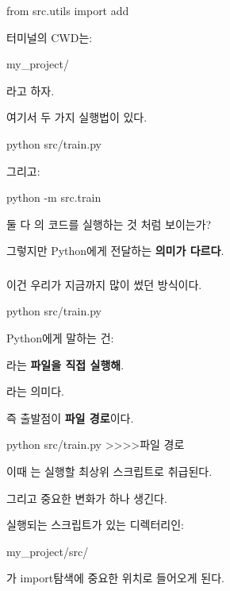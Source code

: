 \begin{dhkcode}
from src.utils import add
\end{dhkcode}

터미널의 CWD는:

\begin{dhkzsh}
my_project/
\end{dhkzsh}

라고 하자.

여기서 두 가지 실행법이 있다.

\begin{dhkzsh}
python src/train.py
\end{dhkzsh}

그리고:

\begin{dhkzsh}
python -m src.train
\end{dhkzsh}

둘 다 의 코드를 실행하는 것 처럼 보이는가?

그렇지만 Python에게 전달하는 \textbf{의미가 다르다}.

\subsubsection{}

이건 우리가 지금까지 많이 썼던 방식이다.

\begin{dhkzsh}
python src/train.py
\end{dhkzsh}

Python에게 말하는 건:

\begin{dhksmry}[centered]
라는 \textbf{파일을 직접 실행해}.
\end{dhksmry}

라는 의미다.

즉 출발점이 \textbf{파일 경로}이다.

\begin{dhkdir}
python src/train.py
>>>>파일 경로
\end{dhkdir}

이때 는 실행할 최상위 스크립트로 취급된다.

그리고 중요한 변화가 하나 생긴다.

실행되는 스크립트가 있는 디렉터리인:

\begin{dhkzsh}
my_project/src/
\end{dhkzsh}

가 import탐색에 중요한 위치로 들어오게 된다.

